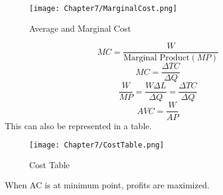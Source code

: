 \begin{figure}[H]
    \centering
    \texttt{[image: Chapter7/MarginalCost.png]}
    \caption{Average and Marginal Cost}
\end{figure}
\par
\begin{equation}
    MC = \frac{W}{\text{Marginal Product}(MP)}
\end{equation}
\begin{equation}
    MC = \frac{\Delta TC}{\Delta Q}
\end{equation}
\begin{equation}
    \frac{W}{MP} = \frac{W\Delta L}{\Delta Q} = \frac{\Delta TC}{\Delta Q}
\end{equation}
\begin{equation}
    AVC = \frac{W}{AP}
\end{equation}
This can also be represented in a table.
\begin{figure}[H]
    \centering
    \texttt{[image: Chapter7/CostTable.png]}
    \caption{Cost Table}
\end{figure}
When AC is at minimum point, profits are maximized.